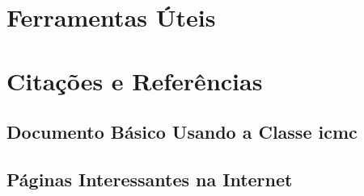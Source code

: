 \documentclass[brazil]{packages/icmc}
\begin{document}
\chapter{Ferramentas Úteis}
\label{chapter:ferramentas-uteis}


\chapter{Citações e Referências}
\label{chapter:citacoes}



% 

\postextual





\glsaddall
\printglossaries


\begin{apendicesenv}

    \chapter{Documento Básico Usando a Classe icmc}
    \label{chapter:documento-basico}
    

\end{apendicesenv}



\begin{anexosenv}

    \chapter{Páginas Interessantes na Internet} 
    \label{chapter:paginas-interessantes}
    

\end{anexosenv}
\end{document}
